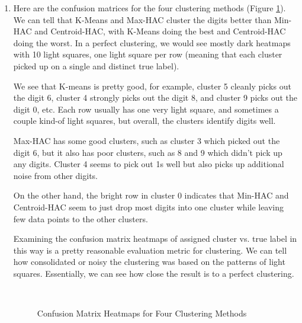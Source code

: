 \documentclass[submit]{harvardml}
\begin{document}
\begin{enumerate}
    \item Here are the confusion matrices for the four clustering methods (Figure \ref{fig:heatmaps}). We can tell that K-Means and Max-HAC cluster the digits better than Min-HAC and Centroid-HAC, with K-Means doing the best and Centroid-HAC doing the worst. In a perfect clustering, we would see mostly dark heatmaps with 10 light squares, one light square per row (meaning that each cluster picked up on a single and distinct true label).
    
    We see that K-means is pretty good, for example, cluster 5 cleanly picks out the digit 6, cluster 4 strongly picks out the digit 8, and cluster 9 picks out the digit 0, etc. Each row usually has one very light square, and sometimes a couple kind-of light squares, but overall, the clusters identify digits well.
    
    Max-HAC has some good clusters, such as cluster 3 which picked out the digit 6, but it also has poor clusters, such as 8 and 9 which didn't pick up any digits. Cluster 4 seems to pick out 1s well but also picks up additional noise from other digits.
    
    On the other hand, the bright row in cluster 0 indicates that Min-HAC and Centroid-HAC seem to just drop most digits into one cluster while leaving few data points to the other clusters.
    
    Examining the confusion matrix heatmaps of assigned cluster vs. true label in this way is a pretty reasonable evaluation metric for clustering. We can tell how consolidated or noisy the clustering was based on the patterns of light squares. Essentially, we can see how close the result is to a perfect clustering.
    \begin{figure}[H]
    \centering
    
     \\
    
    \caption{Confusion Matrix Heatmaps for Four Clustering Methods}
    \label{fig:heatmaps}
    \end{figure}
    
    
\end{enumerate}
\end{document}
